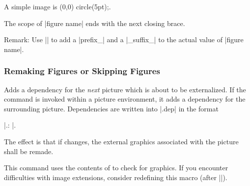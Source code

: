 {\begin{command}{}
\begin{codeexample}

{
  A simple image is \tikz \fill (0,0) circle(5pt);. %

}%


\end{codeexample}
	The scope of |figure name| ends with the next closing brace.

	Remark: Use || to add a |prefix_| and a |_suffix_| to the actual value of |figure name|.
\end{command}


\subsubsection{Remaking Figures or Skipping Figures}
\begin{command}{\tikzpicturedependsonfile{}}
	Adds a dependency for the \emph{next} picture which is about to be externalized. If the command is invoked within a picture environment, it adds a dependency for the surrounding picture. Dependencies are written into |.dep| in the format 
	
	|.\tikzexternalimgextension: |.

	The effect is that if  changes, the external graphics associated with the picture shall be remade.

	This command uses the contents of \declareandlabel{\tikzexternalimgextension} to check for graphics. If you encounter difficulties with image extensions, consider redefining this macro (after |\tikzexternalize|).


\end{command}}
